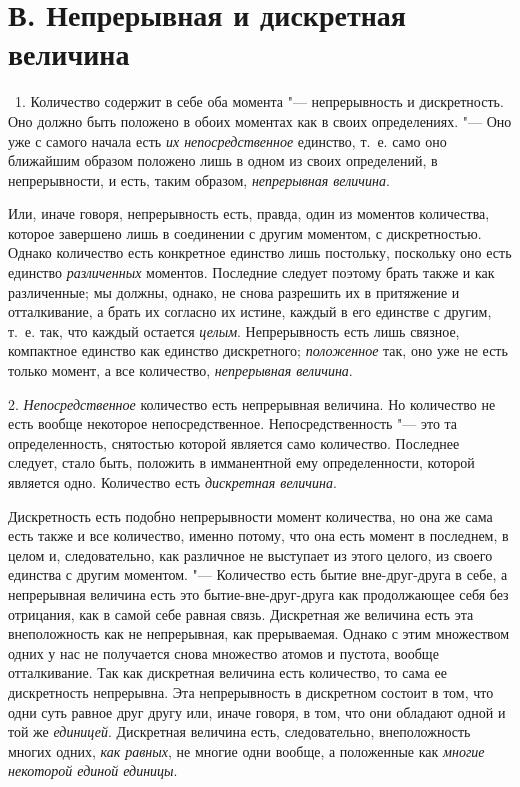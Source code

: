 \label{bkm:bm88b}
\section[В. Непрерывная и дискретная величина]{В. Непрерывная и дискретная величина}

\ 1. Количество содержит в себе оба момента "--- непрерывность и дискретность.
Оно должно быть положено в обоих моментах как в своих определениях. "--- Оно
уже с самого начала есть {\em их непосредственное}
единство, т.~е. само оно ближайшим образом положено лишь в одном из своих
определений, в непрерывности, и есть, таким образом,
{\em непрерывная величина}.

Или, иначе говоря, непрерывность есть, правда, один из моментов количества,
которое завершено лишь в соединении с другим моментом, с дискретностью.
Однако количество есть конкретное единство лишь постольку, поскольку оно
есть единство {\em различенных} моментов. Последние
следует поэтому брать также и как различенные; мы должны, однако, не снова
разрешить их в притяжение и отталкивание, а брать их согласно их истине,
каждый в его единстве с другим, т.~е. так, что каждый остается
{\em целым}. Непрерывность есть лишь связное,
компактное единство как единство дискретного;
{\em положенное} так, оно уже не есть только момент, а
все количество, {\em непрерывная величина}.

2. {\em Непосредственное} количество есть непрерывная
величина. Но количество не есть вообще некоторое непосредственное.
Непосредственность "--- это та определенность, снятостью которой является
само количество. Последнее следует, стало быть, положить в имманентной ему
определенности, которой является одно. Количество есть
{\em дискретная величина}.

Дискретность есть подобно непрерывности момент количества, но она же сама
есть также и все количество, именно потому, что она есть момент в
последнем, в целом и, следовательно, как различное не выступает из этого
целого, из своего единства с другим моментом. "--- Количество есть бытие
вне-друг-друга в себе, а непрерывная величина есть это бытие-вне-друг-друга
как продолжающее себя без отрицания, как в самой себе равная связь.
Дискретная же величина есть эта внеположность как не непрерывная, как
прерываемая. Однако с этим множеством одних у нас не получается снова
множество атомов и пустота, вообще отталкивание. Так как дискретная
величина есть количество, то сама ее дискретность непрерывна. Эта
непрерывность в дискретном состоит в том, что одни суть равное друг другу
или, иначе говоря, в том, что они обладают одной и той же
{\em единицей}. Дискретная величина есть,
следовательно, внеположность многих одних, {\em как
равных}, не многие одни вообще, а положенные как
{\em многие некоторой единой единицы}.

